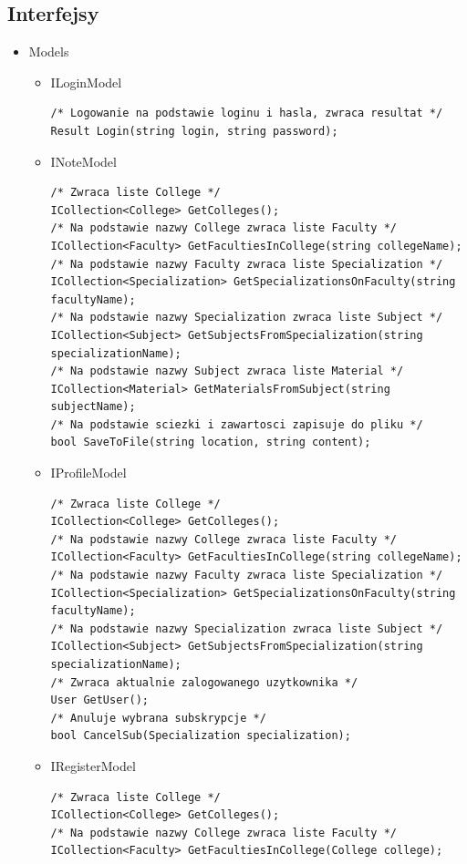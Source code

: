 \documentclass[12pt,a4paper]{article}
\begin{document}
			\subsection{Interfejsy}
			\begin{itemize}
				\item Models
				\begin{itemize}
					\item ILoginModel
\begin{lstlisting}
/* Logowanie na podstawie loginu i hasla, zwraca resultat */
Result Login(string login, string password);
\end{lstlisting}
					\item INoteModel
\begin{lstlisting}
/* Zwraca liste College */
ICollection<College> GetColleges();
/* Na podstawie nazwy College zwraca liste Faculty */
ICollection<Faculty> GetFacultiesInCollege(string collegeName);
/* Na podstawie nazwy Faculty zwraca liste Specialization */
ICollection<Specialization> GetSpecializationsOnFaculty(string facultyName);
/* Na podstawie nazwy Specialization zwraca liste Subject */
ICollection<Subject> GetSubjectsFromSpecialization(string specializationName);
/* Na podstawie nazwy Subject zwraca liste Material */
ICollection<Material> GetMaterialsFromSubject(string subjectName);
/* Na podstawie sciezki i zawartosci zapisuje do pliku */
bool SaveToFile(string location, string content);
\end{lstlisting}
					\item IProfileModel
\begin{lstlisting}
/* Zwraca liste College */
ICollection<College> GetColleges();
/* Na podstawie nazwy College zwraca liste Faculty */
ICollection<Faculty> GetFacultiesInCollege(string collegeName);
/* Na podstawie nazwy Faculty zwraca liste Specialization */
ICollection<Specialization> GetSpecializationsOnFaculty(string facultyName);
/* Na podstawie nazwy Specialization zwraca liste Subject */
ICollection<Subject> GetSubjectsFromSpecialization(string specializationName);
/* Zwraca aktualnie zalogowanego uzytkownika */
User GetUser();
/* Anuluje wybrana subskrypcje */
bool CancelSub(Specialization specialization);
\end{lstlisting}					
					\item IRegisterModel
\begin{lstlisting}
/* Zwraca liste College */
ICollection<College> GetColleges();
/* Na podstawie nazwy College zwraca liste Faculty */
ICollection<Faculty> GetFacultiesInCollege(College college);

\end{lstlisting}
\end{itemize}
\end{itemize}
\end{document}
